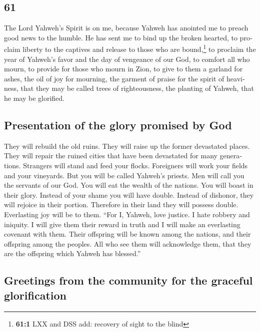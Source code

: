 \begin{paracol}{2}
\begin{otherlanguage}{english}
\hypertarget{section-121}{%
\section{61}\label{section-121}}

 The Lord Yahweh's Spirit is on me, because Yahweh has
anointed me to preach good news to the humble. He has sent me to bind up
the broken hearted, to proclaim liberty to the captives and release to
those who are bound,\footnote{\textbf{61:1} LXX and DSS add: recovery of
  sight to the blind}  to proclaim the year of Yahweh's
favor and the day of vengeance of our God, to comfort all who mourn,
 to provide for those who mourn in Zion, to give to them a
garland for ashes, the oil of joy for mourning, the garment of praise
for the spirit of heaviness, that they may be called trees of
righteousness, the planting of Yahweh, that he may be glorified.

\hypertarget{presentation-of-the-glory-promised-by-god}{%
\subsection{Presentation of the glory promised by
God}\label{presentation-of-the-glory-promised-by-god}}

 They will rebuild the old ruins. They will raise up the
former devastated places. They will repair the ruined cities that have
been devastated for many generations.  Strangers will
stand and feed your flocks. Foreigners will work your fields and your
vineyards.  But you will be called Yahweh's priests. Men
will call you the servants of our God. You will eat the wealth of the
nations. You will boast in their glory.  Instead of your
shame you will have double. Instead of dishonor, they will rejoice in
their portion. Therefore in their land they will possess double.
Everlasting joy will be to them.  ``For I, Yahweh, love
justice. I hate robbery and iniquity. I will give them their reward in
truth and I will make an everlasting covenant with them. 
Their offspring will be known among the nations, and their offspring
among the peoples. All who see them will acknowledge them, that they are
the offspring which Yahweh has blessed.''

\hypertarget{greetings-from-the-community-for-the-graceful-glorification}{%
\subsection{Greetings from the community for the graceful
glorification}\label{greetings-from-the-community-for-the-graceful-glorification}}


\end{otherlanguage}
\end{paracol}
